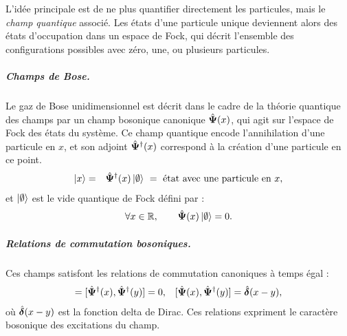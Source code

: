 L’idée principale est de ne plus quantifier directement les particules, mais le \emph{champ quantique} associé. Les états d’une particule unique deviennent alors des états d’occupation dans un espace de Fock, qui décrit l’ensemble des configurations possibles avec zéro, une, ou plusieurs particules.



\subparagraph{Champs de Bose.}
Le gaz de Bose unidimensionnel est décrit dans le cadre de la théorie quantique des champs par un champ bosonique canonique \( \hat{\bm{\Psi}}(x) \), qui agit sur l’espace de Fock des états du système. Ce champ quantique encode l’annihilation d’une particule en \( x \), et son adjoint \( \hat{\bm{\Psi}}^\dag(x) \) correspond à la création d’une particule en ce point. 
\begin{eqnarray}
	\vert x \rangle  & = & \hat{\bm{\Psi}}^\dag (x)\ket{\emptyset} ~=~ \text{état avec une particule en } x,
\end{eqnarray}
et \(\ket{\emptyset}\) est le vide quantique de Fock défini par :
\begin{eqnarray}
	\forall x \in \mathbb{R}, \qquad \hat{\bm{\Psi}}(x) \ket{\emptyset} = 0. \label{chap:eq.vide.fock}
\end{eqnarray}

\subparagraph{Relations de commutation bosoniques.}
Ces champs satisfont les relations de commutation canoniques à temps égal :
\begin{eqnarray}
	 [ \operator{\Psi}(x),  \operator{\Psi}(y)  ]   =  [ \operator{\Psi}^\dag(x),  \operator{\Psi}^\dag(y) ]  =  0,   & & [ \operator{\Psi}(x),  \operator{\Psi}^\dagger(y) ]  =  \operator{\delta}(x - y) ,\label{chap:1:com.1}
\end{eqnarray}
où $\hat{\bm{\delta}}(x - y)$ est la fonction delta de Dirac.  
Ces relations expriment le caractère bosonique des excitations du champ.

